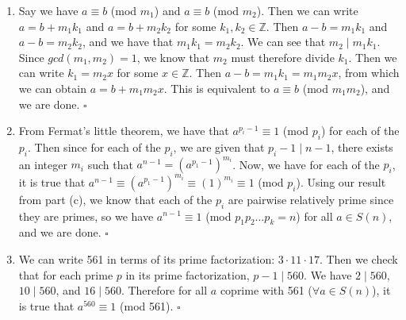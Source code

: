 \begin{enumerate}
\begin{enumerate}
        \item Say we have $a\equiv b$ (mod $m_1$) and $a\equiv b$ (mod $m_2$). Then we can write $a=b+m_1k_1$ and $a=b+m_2k_2$ for some $k_1,k_2\in\mathbb{Z}$. Then $a-b=m_1k_1$ and $a-b=m_2k_2$, and we have that $m_1k_1=m_2k_2$. We can see that $m_2\mid m_1k_1$. Since $gcd(m_1,m_2)=1$, we know that $m_2$ must therefore divide $k_1$. Then we can write $k_1=m_2x$ for some $x\in\mathbb{Z}$. Then $a-b=m_1k_1=m_1m_2x$, from which we can obtain $a=b+m_1m_2x$. This is equivalent to $a\equiv b$ (mod $m_1m_2$), and we are done. $\square$
        
        \item From Fermat's little theorem, we have that $a^{p_i-1}\equiv 1$ (mod $p_i$) for each of the $p_i$. Then since for each of the $p_i$, we are given that $p_i-1\mid n-1$, there exists an integer $m_i$ such that $a^{n-1}=(a^{p_1-1})^{m_i}$. Now, we have for each of the $p_i$, it is true that $a^{n-1}\equiv (a^{p_1-1})^{m_i}\equiv (1)^{m_i}\equiv 1$ (mod $p_i$). Using our result from part (c), we know that each of the $p_i$ are pairwise relatively prime since they are primes, so we have $a^{n-1}\equiv 1$ (mod $p_1p_2\ldots p_k=n$) for all $a\in S(n)$, and we are done. $\square$
        
        \item We can write 561 in terms of its prime factorization: $3\cdot11\cdot17$. Then we check that for each prime $p$ in its prime factorization, $p-1\mid 560$. We have $2\mid560$, $10\mid560$, and $16\mid560$. Therefore for all $a$ coprime with 561 ($\forall a\in S(n)$), it is true that $a^{560}\equiv 1$ (mod 561). $\square$
    \end{enumerate}
\end{enumerate}